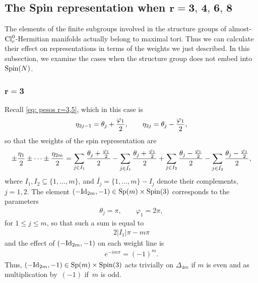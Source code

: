\documentclass[10pt,a4paper]{amsart}
\numberwithin{equation}{section}
\begin{document}
\subsection[The Spin representation when $r=3,4,6,8$]{The Spin representation when $\boldsymbol{r=3,\,4,\,6,\,8}$}\label{subsec: conditions 1}

The elements of the f\/inite subgroups involved in the structure groups of almost-${\rm Cl}_r^0$-Hermitian manifolds actually belong to maximal tori. Thus we can calculate their ef\/fect on representations in terms of the weights we just described. In this subsection, we examine the cases when the structure group does not embed into ${\rm Spin}(N)$.

\subsubsection[$r=3$]{$\boldsymbol{r=3}$}

Recall \eqref{eq: pesos r=3,5}, which in this case is
\begin{gather*}
 \eta_{2j-1} = \theta_j+{\varphi_1\over 2}, \qquad \eta_{2j}= \theta_j-{\varphi_1\over 2} ,
\end{gather*}
so that the weights of the spin representation are
\begin{gather*}
 \pm {\eta_1\over 2} \pm \cdots \pm {\eta_{2m}\over 2} =
 \sum_{j\in I_1} {\theta_j+{\varphi_1\over 2}\over 2} - \sum_{j\in \bar{I_1}} {\theta_j+{\varphi_1\over 2}\over 2}
 + \sum_{j\in I_2} {\theta_j-{\varphi_1\over 2}\over 2} - \sum_{j\in \bar{I_2}} {\theta_j-{\varphi_1\over 2}\over 2},
\end{gather*}
where $I_1,I_2\subseteq \{1,\dots,m\}$, and $\bar{I_j} = \{1,\dots,m\}-I_j$ denote their complements, $j = 1,2$. The element $(-{\rm Id}_{2m},-1)\in {\rm Sp}(m)\times {\rm Spin}(3)$ corresponds to the parameters
\begin{gather*}
 \theta_j = \pi , \qquad \varphi_1 = 2\pi,
\end{gather*}
for $1\leq j\leq m$, so that such a sum is equal to
\begin{gather*}2|I_1|\pi - m\pi\end{gather*}
and the ef\/fect of $(-{\rm Id}_{2m},-1)$ on each weight line is
\begin{gather*}e^{-im\pi} = (-1)^m.
\end{gather*}
Thus, $(-{\rm Id}_{2m},-1)\in {\rm Sp}(m)\times {\rm Spin}(3)$ acts trivially on $\Delta_{4m}$ if $m$ is even and as multiplication by~$(-1)$ if~$m$ is odd.
\end{document}
